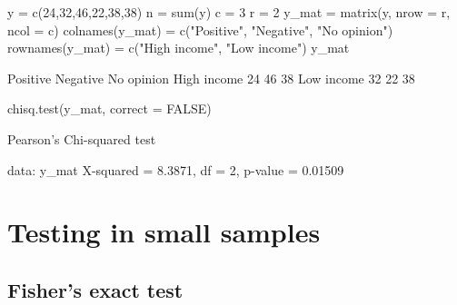 \documentclass[a4paper]{article}
\begin{document}
\begin{Schunk}
\begin{Sinput}
y = c(24,32,46,22,38,38)
n = sum(y)
c = 3
r = 2
y_mat = matrix(y, nrow = r, ncol = c)
colnames(y_mat) = c("Positive", "Negative", "No opinion")
rownames(y_mat) = c("High income", "Low income")
y_mat
\end{Sinput}
\begin{Soutput}
            Positive Negative No opinion
High income       24       46         38
Low income        32       22         38
\end{Soutput}
\begin{Sinput}
chisq.test(y_mat, correct = FALSE)
\end{Sinput}
\begin{Soutput}

	Pearson's Chi-squared test

data:  y_mat
X-squared = 8.3871, df = 2, p-value = 0.01509
\end{Soutput}
\end{Schunk}
\section{Testing in small samples}\label{sec:9}
\subsection{Fisher's exact test}
\end{document}
